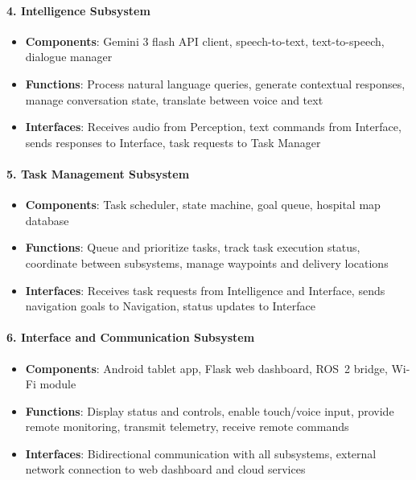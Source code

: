 \paragraph{4. Intelligence Subsystem}
\begin{itemize}
    \item \textbf{Components}: Gemini 3 flash API client, speech-to-text, text-to-speech, dialogue manager
    \item \textbf{Functions}: Process natural language queries, generate contextual responses, manage conversation state, translate between voice and text
    \item \textbf{Interfaces}: Receives audio from Perception, text commands from Interface, sends responses to Interface, task requests to Task Manager
\end{itemize}

\paragraph{5. Task Management Subsystem}
\begin{itemize}
    \item \textbf{Components}: Task scheduler, state machine, goal queue, hospital map database
    \item \textbf{Functions}: Queue and prioritize tasks, track task execution status, coordinate between subsystems, manage waypoints and delivery locations
    \item \textbf{Interfaces}: Receives task requests from Intelligence and Interface, sends navigation goals to Navigation, status updates to Interface
\end{itemize}

\paragraph{6. Interface and Communication Subsystem}
\begin{itemize}
    \item \textbf{Components}: Android tablet app, Flask web dashboard, ROS~2 bridge, Wi-Fi module
    \item \textbf{Functions}: Display status and controls, enable touch/voice input, provide remote monitoring, transmit telemetry, receive remote commands
    \item \textbf{Interfaces}: Bidirectional communication with all subsystems, external network connection to web dashboard and cloud services
\end{itemize}

